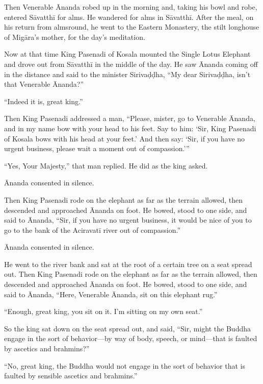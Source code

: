 \documentclass[12pt,openany]{book}%
\begin{document}
Then Venerable Ānanda robed up in the morning and, taking his bowl and robe, entered \textsanskrit{Sāvatthī} for alms. He wandered for alms in \textsanskrit{Sāvatthī}. After the meal, on his return from almsround, he went to the Eastern Monastery, the stilt longhouse of \textsanskrit{Migāra}’s mother, for the day’s meditation. 

Now at that time King Pasenadi of Kosala mounted the Single Lotus Elephant and drove out from \textsanskrit{Sāvatthī} in the middle of the day. He saw Ānanda coming off in the distance and said to the minister \textsanskrit{Sirivaḍḍha}, “My dear \textsanskrit{Sirivaḍḍha}, isn’t that Venerable Ānanda?” 

“Indeed it is, great king.” 

Then King Pasenadi addressed a man, “Please, mister, go to Venerable Ānanda, and in my name bow with your head to his feet. Say to him: ‘Sir, King Pasenadi of Kosala bows with his head at your feet.’ And then say: ‘Sir, if you have no urgent business, please wait a moment out of compassion.’” 

“Yes, Your Majesty,” that man replied. He did as the king asked. 

Ānanda consented in silence. 

Then King Pasenadi rode on the elephant as far as the terrain allowed, then descended and approached Ānanda on foot. He bowed, stood to one side, and said to Ānanda, “Sir, if you have no urgent business, it would be nice of you to go to the bank of the \textsanskrit{Aciravatī} river out of compassion.” 

Ānanda consented in silence. 

He went to the river bank and sat at the root of a certain tree on a seat spread out. Then King Pasenadi rode on the elephant as far as the terrain allowed, then descended and approached Ānanda on foot. He bowed, stood to one side, and said to Ānanda, “Here, Venerable Ānanda, sit on this elephant rug.” 

“Enough, great king, you sit on it. I’m sitting on my own seat.” 

So the king sat down on the seat spread out, and said, “Sir, might the Buddha engage in the sort of behavior—by way of body, speech, or mind—that is faulted by ascetics and brahmins?” 

“No, great king, the Buddha would not engage in the sort of behavior that is faulted by sensible ascetics and brahmins.” 
\end{document}
